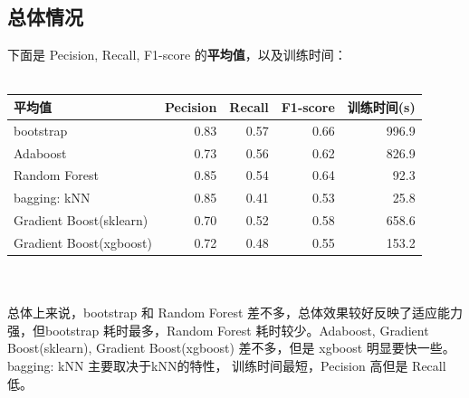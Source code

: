 \documentclass[12pt]{article}
\begin{document}
\subsection{总体情况}
下面是 Pecision, Recall, F1-score 的\textbf{平均值}，以及训练时间：\\
\\
\begin{tabular}{l|r|r|r|r}
  \hline
  平均值 &Pecision&Recall&F1-score&训练时间(s)\\
  \hline
  bootstrap& 0.83&0.57&0.66&996.9\\
  \hline
  Adaboost&0.73&0.56&0.62& 826.9\\
  \hline
  Random Forest&0.85&0.54&0.64& 92.3\\
  \hline
  bagging: kNN&0.85&0.41&0.53& 25.8\\
  \hline
  Gradient Boost(sklearn)&0.70&0.52&0.58& 658.6\\
  \hline
  Gradient Boost(xgboost)&0.72&0.48&0.55& 153.2\\
  \hline
\end{tabular}
\\
\\ 
总体上来说，bootstrap 和 Random Forest 差不多，总体效果较好反映了适应能力强，但bootstrap
耗时最多，Random Forest 耗时较少。Adaboost, Gradient Boost(sklearn), 
Gradient Boost(xgboost) 差不多，但是 xgboost 明显要快一些。bagging: kNN 主要取决于kNN的特性，
训练时间最短，Pecision 高但是 Recall 低。
\\
\end{document}
